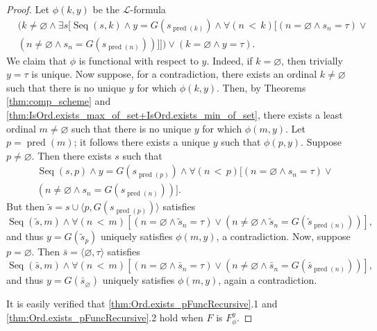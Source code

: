 \begin{proof}
    Let $\phi(k,y)$ be the $\mathcal{L}$-formula
    \begin{equation*}
        \begin{split}
    & (k \neq \varnothing \land \exists s [\operatorname{Seq}(s,k) \land 
    y = G(s_{\operatorname{pred}(k)}) \land \forall (n\,<\,k)[(n=\varnothing \land s_n = \tau)
    \lor\\ &(n \neq \varnothing \land s_n = G(s_{\operatorname{pred}(n)}))]])
    \lor (k = \varnothing \land y = \tau).
        \end{split}
    \end{equation*}
    We claim that $\phi$ is functional with respect to $y$.
    Indeed, if $k=\varnothing$, then trivially $y=\tau$ is unique.
    Now suppose, for a contradiction, there exists an ordinal $k\neq \varnothing$ such that there
    is no unique $y$ for which $\phi(k,y)$. 
    Then, by Theorems \ref{thm:comp_scheme} and 
    \ref{thm:IsOrd.exists_max_of_set+IsOrd.exists_min_of_set}, there exists a
    least ordinal $m\neq\varnothing$ such that there is no unique $y$ for which $\phi(m,y)$.
    Let $p=\operatorname{pred}(m)$; it follows there exists a unique $y$ such that $\phi(p,y)$.
    Suppose $p\neq \varnothing$. Then there exists $s$ such that
    \begin{equation*}
        \begin{split}
    &\operatorname{Seq}(s,p) \land y = G(s_{\operatorname{pred}(p)}) \land 
    \forall (n\,<\,p)[(n=\varnothing \land s_n = \tau) \lor \\& 
    (n \neq \varnothing \land s_n = G(s_{\operatorname{pred}(n)}))].
        \end{split}
    \end{equation*}
    But then $\tilde{s} = s \cup \langle p, G(s_{\operatorname{pred}(p)}) \rangle$ satisfies
    \begin{equation*}
    \operatorname{Seq}(\tilde{s},m) \land \forall (n\,<\,m)[(n=\varnothing \land \tilde{s}_n = \tau) 
    \lor (n \neq \varnothing \land \tilde{s}_n = G(\tilde{s}_{\operatorname{pred}(n)}))], 
    \end{equation*}
    and thus $y = G(\tilde{s}_p)$ uniquely satisfies $\phi(m,y)$, a contradiction.
    Now, suppose $p=\varnothing$. Then $\bar{s}=\langle \varnothing, \tau \rangle$ satisfies
    \begin{equation*}
        \operatorname{Seq}(\bar{s},m) \land \forall (n\,<\,m)[(n=\varnothing \land \bar{s}_n = \tau) 
        \lor (n \neq \varnothing \land \bar{s}_n = G(\bar{s}_{\operatorname{pred}(n)}))], 
    \end{equation*}
    and thus $y = G(\bar{s}_\varnothing)$ uniquely satisfies $\phi(m,y)$, again a contradiction.
    
    It is easily verified that \ref{thm:Ord.exists_pFuncRecursive}.1 and 
    \ref{thm:Ord.exists_pFuncRecursive}.2 hold when $F$ is $F_\phi^y$.
\end{proof}


